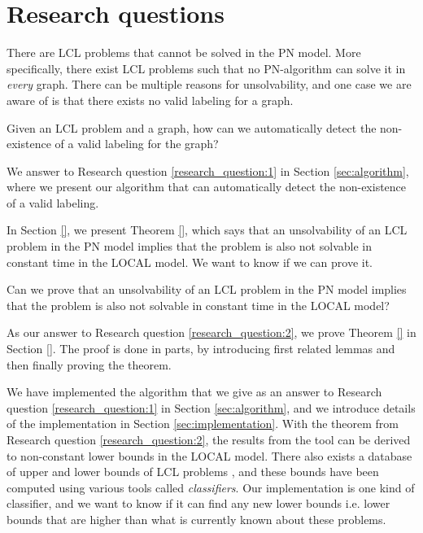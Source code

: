 
\section{Research questions} \label{sec:research_question}

There are LCL problems that cannot be solved in the PN model.
More specifically, there exist LCL problems such that no PN-algorithm can solve it in \emph{every} graph.
There can be multiple reasons for unsolvability, and one case we are aware of is that there exists no valid labeling for a graph.

\begin{researchquestion} \label{research_question:1}
Given an LCL problem and a graph, how can we automatically detect the non-existence of a valid labeling for the graph?
\end{researchquestion}

We answer to Research question \ref{research_question:1} in Section \ref{sec:algorithm}, where we present our algorithm that can automatically detect the non-existence of a valid labeling.

In Section \ref{}, we present Theorem \ref{}, which says that an unsolvability of an LCL problem in the PN model implies that the problem is also not solvable in constant time in the LOCAL model.
We want to know if we can prove it.

\begin{researchquestion} \label{research_question:2}
Can we prove that an unsolvability of an LCL problem in the PN model implies that the problem is also not solvable in constant time in the LOCAL model?
\end{researchquestion}

As our answer to Research question \ref{research_question:2}, we prove Theorem \ref{} in Section \ref{}.
The proof is done in parts, by introducing first related lemmas and then finally proving the theorem.

We have implemented the algorithm that we give as an answer to Research question \ref{research_question:1} in Section \ref{sec:algorithm}, and we introduce details of the implementation in Section \ref{sec:implementation}.
With the theorem from Research question \ref{research_question:2}, the results from the tool can be derived to non-constant lower bounds in the LOCAL model.
There also exists a database of upper and lower bounds of LCL problems \cite{Tereshchenko2021}, and these bounds have been computed using various tools called \emph{classifiers}.
Our implementation is one kind of classifier, and we want to know if it can find any new lower bounds i.e. lower bounds that are higher than what is currently known about these problems.

